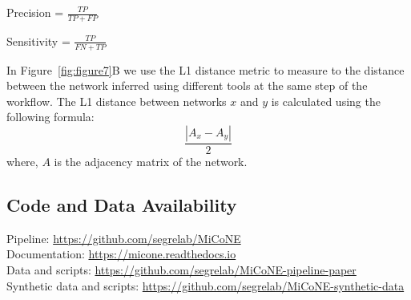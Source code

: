   Precision = $\frac{TP}{TP + FP}$

  Sensitivity = $\frac{TP}{FN + TP}$

  In Figure~\ref{fig:figure7}B we use the L1 distance metric to measure to the distance between the network inferred using different tools at the same step of the workflow.
  The L1 distance between networks $x$ and $y$ is calculated using the following formula:
  $$\frac{|A_{x} - A_{y}|}{2}$$
  where, $A$ is the adjacency matrix of the network.

  \subsection*{Code and Data Availability}
  Pipeline: \href{https://github.com/segrelab/MiCoNE}{https://github.com/segrelab/MiCoNE} \\
  Documentation: \href{https://micone.readthedocs.io}{https://micone.readthedocs.io} \\
  Data and scripts: \href{https://github.com/segrelab/MiCoNE-pipeline-paper}{https://github.com/segrelab/MiCoNE-pipeline-paper} \\
  Synthetic data and scripts: \href{https://github.com/segrelab/MiCoNE-synthetic-data}{https://github.com/segrelab/MiCoNE-synthetic-data}

